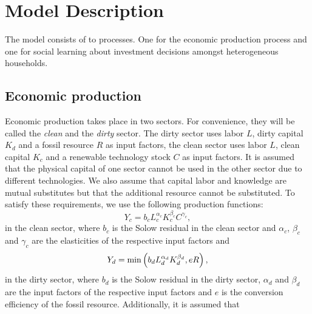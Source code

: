 \section{Model Description}
\label{sec:Model_Description}
The model consists of to processes. One for the economic production process and one for social learning about investment decisions amongst heterogeneous households.

\subsection{Economic production}
\label{sec:model_description}

Economic production takes place in two sectors. For convenience, they will be called the \textit{clean} and the \textit{dirty} sector. The dirty sector uses labor $L$, dirty capital $K_d$ and a fossil resource $R$ as input factors, the clean sector uses labor $L$, clean capital $K_c$ and a renewable technology stock $C$ as input factors. It is assumed that the physical capital of one sector cannot be used in the other sector due to different technologies. We also assume that capital labor and knowledge are mutual substitutes but that the additional resource cannot be substituted. To satisfy these requirements, we use the following production functions:
\begin{equation}
	Y_c = b_c L_c^{\alpha_c}K_c^{\beta_c}C^{\gamma_c}, 
	\label{eq:clean_production}
\end{equation}
in the clean sector, where $b_c$ is the Solow residual in the clean sector and $\alpha_c$, $\beta_c$ and $\gamma_c$ are the elasticities of the respective input factors and
\begin{equation}
	Y_d = {\rm min}\left( b_d L_d^{\alpha_d}K_d^{\beta_d}, e R \right),
	\label{eq:dirty_production}
\end{equation}
in the dirty sector, where $b_d$ is the Solow residual in the dirty sector, $\alpha_d$ and $\beta_d$ are the input factors of the respective input factors and $e$ is the conversion efficiency of the fossil resource.
Additionally, it is assumed that
